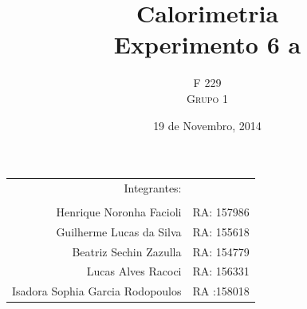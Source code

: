 \documentclass[a4paper]{article}
\title{Calorimetria \\ Experimento 6 a} %
\author{F 229 \\ \textsc{Grupo 1}}
\date{19 de Novembro, 2014}
\providecommand{\tabularnewline}{\\}
\providecommand{\tabularnewline}{\\} %
\begin{document}
\maketitle

\begin{center}
	\begin{tabular}{rr}
		                     Integrantes: & \tabularnewline
		                                  & \tabularnewline
		Henrique Noronha Facioli          & RA: 157986 \tabularnewline
		Guilherme Lucas da Silva          & RA: 155618 \tabularnewline
		Beatriz Sechin Zazulla            & RA: 154779 \tabularnewline
		Lucas Alves Racoci                & RA: 156331 \tabularnewline
		Isadora Sophia Garcia Rodopoulos  & RA :158018 \tabularnewline
	\end{tabular}
\par\end{center}

\end{document}
